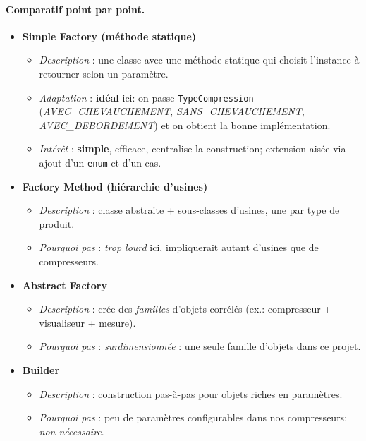 \paragraph{Comparatif point par point.}
\begin{itemize}
  \item \textbf{Simple Factory (méthode statique)}
    \begin{itemize}
      \item \emph{Description} : une classe avec une méthode statique qui choisit l'instance à retourner selon un paramètre.
      \item \emph{Adaptation} : \textbf{idéal} ici: on passe \texttt{TypeCompression} (\textit{AVEC\_CHEVAUCHEMENT}, \textit{SANS\_CHEVAUCHEMENT}, \textit{AVEC\_DEBORDEMENT}) et on obtient la bonne implémentation.
      \item \emph{Intérêt} : \textbf{simple}, efficace, centralise la construction; extension aisée via ajout d'un \texttt{enum} et d'un cas.
    \end{itemize}
  \item \textbf{Factory Method (hiérarchie d'usines)}
    \begin{itemize}
      \item \emph{Description} : classe abstraite + sous-classes d'usines, une par type de produit.
      \item \emph{Pourquoi pas} : \textit{trop lourd} ici, impliquerait autant d'usines que de compresseurs.
    \end{itemize}
  \item \textbf{Abstract Factory}
    \begin{itemize}
      \item \emph{Description} : crée des \emph{familles} d'objets corrélés (ex.: compresseur + visualiseur + mesure).
      \item \emph{Pourquoi pas} : \textit{surdimensionnée} : une seule famille d'objets dans ce projet.
    \end{itemize}
  \item \textbf{Builder}
    \begin{itemize}
      \item \emph{Description} : construction pas-à-pas pour objets riches en paramètres.
      \item \emph{Pourquoi pas} : peu de paramètres configurables dans nos compresseurs; \textit{non nécessaire}.
    \end{itemize}
\end{itemize}

